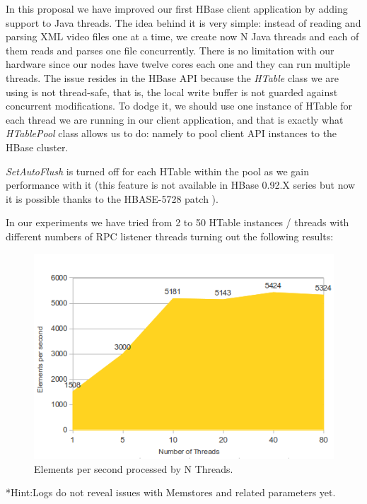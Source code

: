 In this proposal we have improved our first HBase client application by adding support to Java threads. The idea behind it is very simple: instead of reading and parsing XML video files one at a time, we create now N Java threads and each of them reads and parses one file concurrently. There is no limitation with our hardware since our nodes have twelve cores each one and they can run multiple threads. The issue resides in the HBase API because the \textit{HTable} class we are using is not thread-safe, that is, the local write buffer is not guarded against concurrent modifications. To dodge it, we should use one instance of HTable for each thread we are running in our client application, and that is exactly what \textit{HTablePool} class allows us to do: namely to pool client API instances to the HBase cluster.
\par
\textit{SetAutoFlush} is turned off for each HTable within the pool as we gain performance with it (this feature is not available in HBase 0.92.X series but now it is possible thanks to the HBASE-5728 patch \cite{HBase5728}). 
\par
 In our experiments we have tried from 2 to 50 HTable instances / threads with different numbers of RPC listener threads turning out the following results:


\begin{figure}[htb]
\centering
\includegraphics[width=1\textwidth]{./images/threadsworking.png}
\caption{Elements per second processed by N Threads.} \label{fig:threadsworking}
\end{figure}




*Hint:Logs do not reveal issues with Memstores and related parameters yet.

